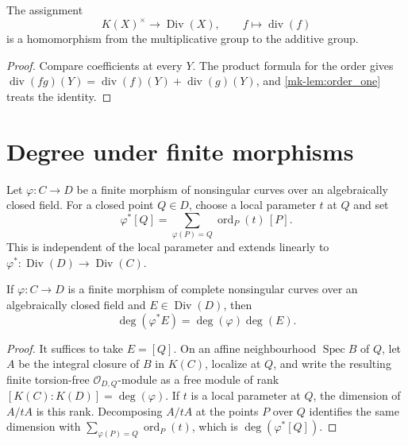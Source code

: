 \begin{theorem}
  \label{mk-thm:principal_hom}
  \leanok


  The assignment
  \[
    K(X)^\times\longrightarrow\operatorname{Div}(X),
    \qquad f\longmapsto\operatorname{div}(f)
  \]
  is a homomorphism from the multiplicative group to the additive group.
\end{theorem}
\begin{proof}
  \leanok
  Compare coefficients at every \(Y\).  The product formula for the order
  gives
  \(\operatorname{div}(fg)(Y)=\operatorname{div}(f)(Y)
    +\operatorname{div}(g)(Y)\), and \ref{mk-lem:order_one} treats the
  identity.
\end{proof}

\section{Degree under finite morphisms}

\begin{definition}
  \label{mk-def:finite_curve_divisor_pullback}

  Let \(\varphi\colon C\to D\) be a finite morphism of nonsingular curves
  over an algebraically closed field.
  For a closed point \(Q\in D\), choose a local parameter \(t\) at \(Q\) and
  set
  \[
    \varphi^*[Q]
      =\sum_{\varphi(P)=Q}\operatorname{ord}_P(t)\,[P].
  \]
  This is independent of the local parameter and extends linearly to
  \(\varphi^*\colon\operatorname{Div}(D)\to\operatorname{Div}(C)\).
\end{definition}

\begin{theorem}
  \label{mk-thm:finite_curve_degree_pullback}

  If \(\varphi\colon C\to D\) is a finite morphism of complete nonsingular
  curves over an algebraically closed field and
  \(E\in\operatorname{Div}(D)\), then
  \[
    \deg(\varphi^*E)=\deg(\varphi)\deg(E).
  \]
\end{theorem}
\begin{proof}
  It suffices to take \(E=[Q]\).  On an affine neighbourhood
  \(\operatorname{Spec}B\) of \(Q\), let \(A\) be the integral closure of
  \(B\) in \(K(C)\), localize at \(Q\), and write the resulting finite
  torsion-free \(\mathcal O_{D,Q}\)-module as a free module of rank
  \([K(C):K(D)]=\deg(\varphi)\).  If \(t\) is a local parameter at \(Q\),
  the dimension of \(A/tA\) is this rank.  Decomposing \(A/tA\) at the
  points \(P\) over \(Q\) identifies the same dimension with
  \(\sum_{\varphi(P)=Q}\operatorname{ord}_P(t)\), which is
  \(\deg(\varphi^*[Q])\).
\end{proof}

